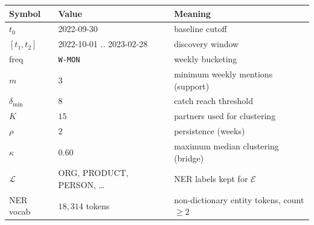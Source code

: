 \documentclass[11pt]{article}
\newcommand{\Ent}{\mathcal{E}}                            %
\renewcommand{\deg}{\delta}                               %
\theoremstyle{definition}
\theoremstyle{remark}
\begin{document}
\begin{center}
\begin{tabular}{lll}
\toprule
Symbol & Value & Meaning \\
\midrule
$t_0$              & 2022-09-30 & baseline cutoff \\
$[t_1,t_2]$        & 2022-10-01 .. 2023-02-28 & discovery window \\
freq               & \texttt{W-MON} & weekly bucketing \\
$m$                & $3$  & minimum weekly mentions (support) \\
$\deg_{\min}$      & $8$  & catch reach threshold \\
$K$                & $15$ & partners used for clustering \\
$\rho$             & $2$  & persistence (weeks) \\
$\kappa$           & $0.60$ & maximum median clustering (bridge) \\
$\mathcal{L}$      & ORG, PRODUCT, PERSON, \dots & NER labels kept for $\Ent$ \\
NER vocab          & $18{,}314$ tokens & non-dictionary entity tokens, count $\ge 2$ \\
\bottomrule
\end{tabular}
\end{center}
\end{document}

